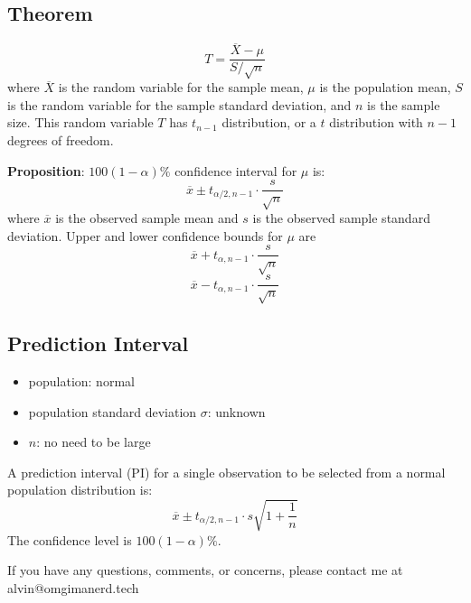 \documentclass[letterpaper, 12pt]{math}
\begin{document}
\subsection*{Theorem}
\[ T = \frac{\overline{X}-\mu}{S/\sqrt{n}} \]
where \( \overline{X} \) is the random variable for the sample mean, \( \mu \)
is the population mean, \( S \) is the random variable for the sample standard
deviation, and \( n \) is the sample size. This random variable \( T \) has
\( t_{n-1} \) distribution, or a \( t \) distribution with \( n-1 \) degrees of
freedom. \par
\textbf{Proposition}: \( 100(1-\alpha)\% \) confidence interval for \( \mu \)
is:
\[ \overline{x}\pm t_{\alpha/2,n-1}\cdot\frac{s}{\sqrt{n}} \]
where \( \overline{x} \) is the observed sample mean and \( s \) is the observed
sample standard deviation. Upper and lower confidence bounds for \( \mu \) are
\[ \overline{x}+t_{\alpha,n-1}\cdot\frac{s}{\sqrt{n}} \]
\[ \overline{x}-t_{\alpha,n-1}\cdot\frac{s}{\sqrt{n}} \]

\subsection*{Prediction Interval}
\begin{itemize}
  \item population: normal
  \item population standard deviation \( \sigma \): unknown
  \item \( n \): no need to be large
\end{itemize}
A prediction interval (PI) for a single observation to be selected from a normal
population distribution is:
\[ \overline{x}\pm t_{\alpha/2,n-1}\cdot s\sqrt{1+\frac{1}{n}} \]
The confidence level is \( 100(1-\alpha)\% \).

\begin{center}
  If you have any questions, comments, or concerns, please contact me at
  alvin@omgimanerd.tech
\end{center}
\end{document}

